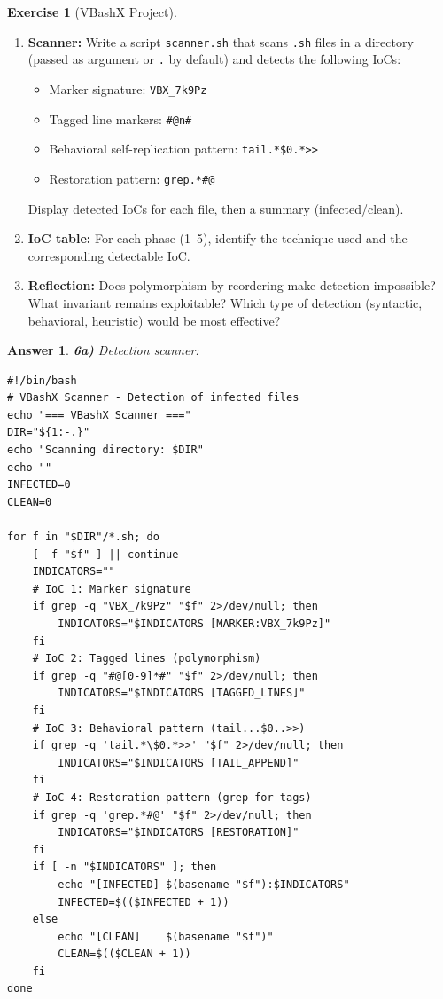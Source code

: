 \documentclass[a4paper,11pt]{article}
\theoremstyle{plain}
\newtheorem{correction}{Answer}
\theoremstyle{definition}
\newtheorem{exercice}{Exercise}
\begin{document}
\begin{exercice}[VBashX Project]
\begin{enumerate}
\item[\textbf{6a)}] \textbf{Scanner:} Write a script \texttt{scanner.sh} that scans \texttt{.sh} files in a directory (passed as argument or \texttt{.} by default) and detects the following IoCs:
\begin{itemize}
    \item Marker signature: \texttt{VBX\_7k9Pz}
    \item Tagged line markers: \texttt{\#@n\#}
    \item Behavioral self-replication pattern: \texttt{tail.*\$0.*>>}
    \item Restoration pattern: \texttt{grep.*\#@}
\end{itemize}
Display detected IoCs for each file, then a summary (infected/clean).

\item[\textbf{6b)}] \textbf{IoC table:} For each phase (1--5), identify the technique used and the corresponding detectable IoC.

\item[\textbf{6c)}] \textbf{Reflection:} Does polymorphism by reordering make detection impossible? What invariant remains exploitable? Which type of detection (syntactic, behavioral, heuristic) would be most effective?
\end{enumerate}

\begin{correction}

\textbf{6a)} Detection scanner:
\begin{lstlisting}[title=scanner.sh]
#!/bin/bash
# VBashX Scanner - Detection of infected files
echo "=== VBashX Scanner ==="
DIR="${1:-.}"
echo "Scanning directory: $DIR"
echo ""
INFECTED=0
CLEAN=0

for f in "$DIR"/*.sh; do
    [ -f "$f" ] || continue
    INDICATORS=""
    # IoC 1: Marker signature
    if grep -q "VBX_7k9Pz" "$f" 2>/dev/null; then
        INDICATORS="$INDICATORS [MARKER:VBX_7k9Pz]"
    fi
    # IoC 2: Tagged lines (polymorphism)
    if grep -q "#@[0-9]*#" "$f" 2>/dev/null; then
        INDICATORS="$INDICATORS [TAGGED_LINES]"
    fi
    # IoC 3: Behavioral pattern (tail...$0..>>)
    if grep -q 'tail.*\$0.*>>' "$f" 2>/dev/null; then
        INDICATORS="$INDICATORS [TAIL_APPEND]"
    fi
    # IoC 4: Restoration pattern (grep for tags)
    if grep -q 'grep.*#@' "$f" 2>/dev/null; then
        INDICATORS="$INDICATORS [RESTORATION]"
    fi
    if [ -n "$INDICATORS" ]; then
        echo "[INFECTED] $(basename "$f"):$INDICATORS"
        INFECTED=$(($INFECTED + 1))
    else
        echo "[CLEAN]    $(basename "$f")"
        CLEAN=$(($CLEAN + 1))
    fi
done


\end{lstlisting}
\end{correction}
\end{exercice}
\end{document}

